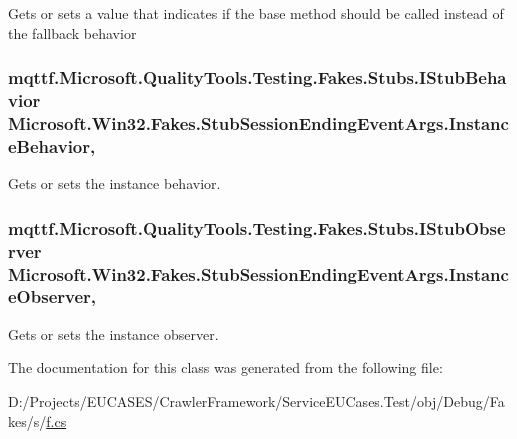 Gets or sets a value that indicates if the base method should be called instead of the fallback behavior

\hypertarget{class_microsoft_1_1_win32_1_1_fakes_1_1_stub_session_ending_event_args_a9c62d46f6d2a8039397aa6a7a4635aab}{
\subsubsection[{Instance\-Behavior}]{\setlength{\rightskip}{0pt plus 5cm}mqttf.\-Microsoft.\-Quality\-Tools.\-Testing.\-Fakes.\-Stubs.\-I\-Stub\-Behavior Microsoft.\-Win32.\-Fakes.\-Stub\-Session\-Ending\-Event\-Args.\-Instance\-Behavior\hspace{0.3cm}{\ttfamily [get]}, {\ttfamily [set]}}}\label{class_microsoft_1_1_win32_1_1_fakes_1_1_stub_session_ending_event_args_a9c62d46f6d2a8039397aa6a7a4635aab}


Gets or sets the instance behavior.

\hypertarget{class_microsoft_1_1_win32_1_1_fakes_1_1_stub_session_ending_event_args_ababa10f8917838289be2dd165ff7caa2}{
\subsubsection[{Instance\-Observer}]{\setlength{\rightskip}{0pt plus 5cm}mqttf.\-Microsoft.\-Quality\-Tools.\-Testing.\-Fakes.\-Stubs.\-I\-Stub\-Observer Microsoft.\-Win32.\-Fakes.\-Stub\-Session\-Ending\-Event\-Args.\-Instance\-Observer\hspace{0.3cm}{\ttfamily [get]}, {\ttfamily [set]}}}\label{class_microsoft_1_1_win32_1_1_fakes_1_1_stub_session_ending_event_args_ababa10f8917838289be2dd165ff7caa2}


Gets or sets the instance observer.



The documentation for this class was generated from the following file\-:\begin{DoxyCompactItemize}
\item 
D\-:/\-Projects/\-E\-U\-C\-A\-S\-E\-S/\-Crawler\-Framework/\-Service\-E\-U\-Cases.\-Test/obj/\-Debug/\-Fakes/s/\hyperlink{s_2f_8cs}{f.\-cs}\end{DoxyCompactItemize}
